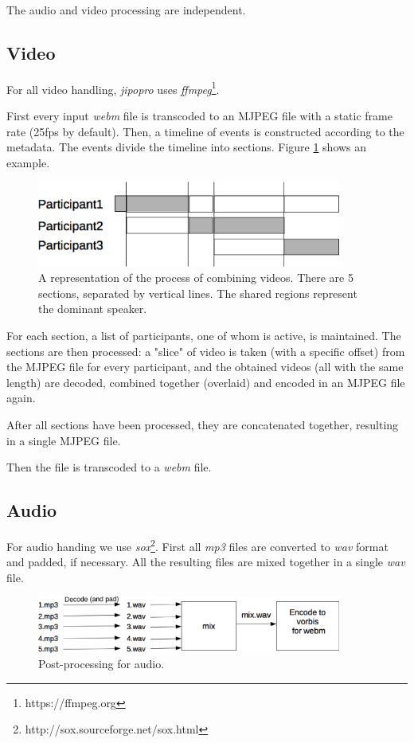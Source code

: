 \documentclass[twoside,openright,a4paper,12pt,english]{article}
\begin{document}
The audio and video processing are independent.


\subsection{Video}
For all video handling, \emph{jipopro} uses \emph{ffmpeg}\footnote{https://ffmpeg.org}.

First every input \emph{webm} file is transcoded to an MJPEG file with a static
frame rate (25fps by default). Then, a timeline of events is constructed
according to the metadata. The events divide the timeline into sections. Figure \ref{jipopro-video} shows an example.

\begin{figure}[h]
    \includegraphics[width=10cm]{./pics/jipopro-video.eps}
    \caption{A representation of the process of combining videos. There are 5 sections,
    separated by vertical lines. The shared regions represent the dominant
    speaker.}
    \label{jipopro-video}
\end{figure}
For each section, a list of participants, one of whom is active, is maintained.
The sections are then processed: a "slice" of video is taken
(with a specific offset) from the MJPEG file for every participant, and the
obtained videos (all with the same length) are decoded, combined together (overlaid)
and encoded in an MJPEG file again.

After all sections have been processed, they are concatenated together, resulting in
a single MJPEG file.

Then the file is transcoded to a \emph{webm} file.


\subsection{Audio}
For audio handing we use \emph{sox}\footnote{http://sox.sourceforge.net/sox.html}.
First all \emph{mp3} files are converted to \emph{wav} format and padded, if
necessary. All the resulting files are mixed together in a single \emph{wav}
file.

\begin{figure}[h]
    \includegraphics[width=10cm]{./pics/audio-popro.eps}
    \caption{Post-processing for audio.}
\end{figure}
\end{document}

